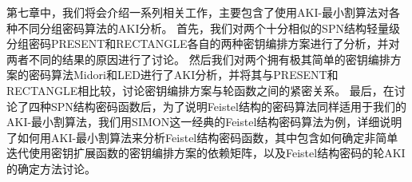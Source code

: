 第七章中，我们将会介绍一系列相关工作，主要包含了使用AKI-最小割算法对各种不同分组密码算法的AKI分析。
首先，我们对两个十分相似的SPN结构轻量级分组密码PRESENT和RECTANGLE各自的两种密钥编排方案进行了分析，并对两者不同的结果的原因进行了讨论。
然后我们对两个拥有极其简单的密钥编排方案的密码算法Midori和LED进行了AKI分析，并将其与PRESENT和RECTANGLE相比较，讨论密钥编排方案与轮函数之间的紧密关系。
最后，在讨论了四种SPN结构密码函数后，为了说明Feistel结构的密码算法同样适用于我们的AKI-最小割算法，我们用SIMON这一经典的Feistel结构密码算法为例，详细说明了如何用AKI-最小割算法来分析Feistel结构密码函数，其中包含如何确定非简单迭代使用密钥扩展函数的密钥编排方案的依赖矩阵，以及Feistel结构密码的轮AKI的确定方法讨论。
